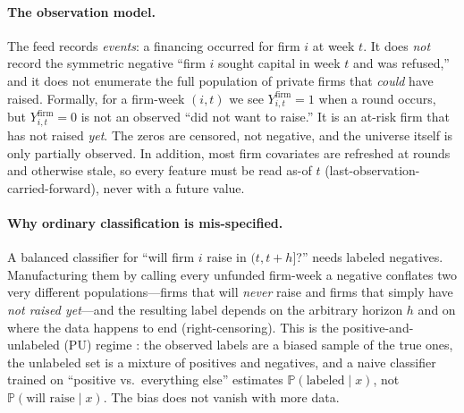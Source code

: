 \documentclass[11pt]{article}
\theoremstyle{plain}
\theoremstyle{definition}
\theoremstyle{remark}
\newcommand{\Prob}{\mathbb{P}}
\begin{document}
\paragraph{The observation model.}
The feed records \emph{events}: a financing occurred for firm $i$ at week $t$. It does \emph{not} record the symmetric negative ``firm $i$ sought capital in week $t$ and was refused,'' and it does not enumerate the full population of private firms that \emph{could} have raised. Formally, for a firm-week $(i,t)$ we see $Y^{\mathrm{firm}}_{i,t}=1$ when a round occurs, but $Y^{\mathrm{firm}}_{i,t}=0$ is not an observed ``did not want to raise.'' It is an at-risk firm that has not raised \emph{yet}. The zeros are censored, not negative, and the universe itself is only partially observed. In addition, most firm covariates are refreshed at rounds and otherwise stale, so every feature must be read as-of $t$ (last-observation-carried-forward), never with a future value.

\paragraph{Why ordinary classification is mis-specified.}
A balanced classifier for ``will firm $i$ raise in $(t,t+h]$?'' needs labeled negatives. Manufacturing them by calling every unfunded firm-week a negative conflates two very different populations---firms that will \emph{never} raise and firms that simply have \emph{not raised yet}---and the resulting label depends on the arbitrary horizon $h$ and on where the data happens to end (right-censoring). This is the positive-and-unlabeled (PU) regime \citep{elkan2008}: the observed labels are a biased sample of the true ones, the unlabeled set is a mixture of positives and negatives, and a naive classifier trained on ``positive vs.\ everything else'' estimates $\Prob(\text{labeled}\mid x)$, not $\Prob(\text{will raise}\mid x)$. The bias does not vanish with more data.
\end{document}
